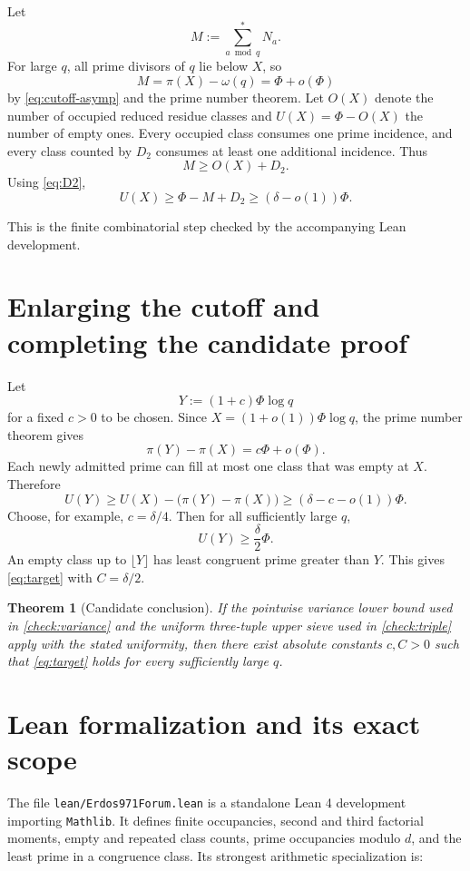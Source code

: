 \documentclass[11pt]{article}
\newtheorem{theorem}{Theorem}[section]
\theoremstyle{definition}
\theoremstyle{remark}
\begin{document}
Let
\[
  M:=\sum_{a\bmod q}^{*}N_a.
\]
For large $q$, all prime divisors of $q$ lie below $X$, so
\[
  M=\pi(X)-\omega(q)=\Phi+o(\Phi)
\]
by \eqref{eq:cutoff-asymp} and the prime number theorem.
Let $O(X)$ denote the number of occupied reduced residue classes and $U(X)=\Phi-O(X)$ the number of empty ones.
Every occupied class consumes one prime incidence, and every class counted by $D_2$ consumes at least one additional incidence. Thus
\[
  M\ge O(X)+D_2.
\]
Using \eqref{eq:D2},
\begin{equation}\label{eq:empty-base}
  U(X)\ge \Phi-M+D_2\ge(\delta-o(1))\Phi.
\end{equation}

This is the finite combinatorial step checked by the accompanying Lean development.

\section{Enlarging the cutoff and completing the candidate proof}

Let
\[
  Y:=(1+c)\Phi\log q
\]
for a fixed $c>0$ to be chosen.
Since $X=(1+o(1))\Phi\log q$, the prime number theorem gives
\begin{equation}\label{eq:new-primes}
  \pi(Y)-\pi(X)=c\Phi+o(\Phi).
\end{equation}
Each newly admitted prime can fill at most one class that was empty at $X$.
Therefore
\[
  U(Y)\ge U(X)-\bigl(\pi(Y)-\pi(X)\bigr)
  \ge(\delta-c-o(1))\Phi.
\]
Choose, for example, $c=\delta/4$.
Then for all sufficiently large $q$,
\[
  U(Y)\ge\frac\delta2\Phi.
\]
An empty class up to $\lfloor Y\rfloor$ has least congruent prime greater than $Y$.
This gives \eqref{eq:target} with $C=\delta/2$.

\begin{theorem}[Candidate conclusion]\label{thm:candidate}
If the pointwise variance lower bound used in \cref{check:variance} and the uniform three-tuple upper sieve used in \cref{check:triple} apply with the stated uniformity, then there exist absolute constants $c,C>0$ such that \eqref{eq:target} holds for every sufficiently large $q$.
\end{theorem}

\section{Lean formalization and its exact scope}

The file \texttt{lean/Erdos971Forum.lean} is a standalone Lean 4 development importing \texttt{Mathlib}.
It defines finite occupancies, second and third factorial moments, empty and repeated class counts, prime occupancies modulo $d$, and the least prime in a congruence class.
Its strongest arithmetic specialization is:
\end{document}
